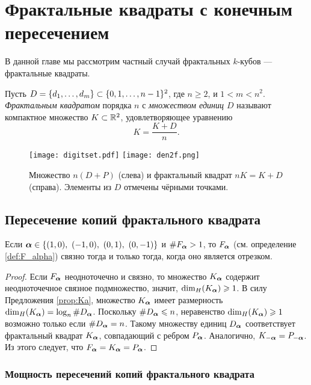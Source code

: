 \newpage
\chapter{Фрактальные квадраты с конечным пересечением}


В данной главе мы рассмотрим частный случай фрактальных $k$-кубов --- фрактальные квадраты.

\begin{definition}\label{dfn:FS} 
Пусть $D=\{d_1,\ldots,d_m\}\subset\{0,1,\ldots,n-1\}^2$, где $n\ge 2$, и $1<m<n^2$.
{\em Фрактальным квадратом} порядка $n$ с {\em множеством единиц $D$} называют компактное множество $K\subset\mathbb{R}^2$, удовлетворяющее уравнению
$$
K=\dfrac{K+D}{n}.
$$
\end{definition}

\begin{figure}[h]
 \centering
 \texttt{[image: digitset.pdf]}
 \hfill
 \texttt{[image: den2f.png]}
 \caption{Множество $n(D+P)$ (слева) и фрактальный квадрат $nK=K+D$ (справа). Элементы из $D$ отмечены чёрными точками.}
 \label{fig:fr_sq}
\end{figure}


\section{Пересечение копий фрактального квадрата}

\begin{corollary}
Если $\bma\in\{(1,0),\ (-1,0),\ (0,1),\ (0,-1)\}$ и $\#F_{\bm{\alpha}}>1$, то $F_{\bm{\alpha}}$ (см. определение \ref{def:F_alpha}) связно тогда и только тогда, когда оно является отрезком.
\end{corollary}

\begin{proof}
Если $F_{\bm{\alpha}}$ неодноточечно и связно, то множество $K_{{\bm{\alpha}}}$ содержит неодноточечное связное подмножество, значит, $\dim_H(K_{{\bm{\alpha}}})\geqslant1$.
В силу Предложения \ref{prop:Ka}, множество $K_{{\bm{\alpha}}}$ имеет размерность $\dim_H(K_{{\bm{\alpha}}})=\log_n\#D_{{\bm{\alpha}}}$.
Поскольку $\#D_{{\bm{\alpha}}}\leqslant n$, неравенство $\dim_H(K_{{\bm{\alpha}}})\geqslant1$ возможно только если $\#D_{{\bm{\alpha}}}= n$.
Такому множеству единиц $D_{{\bm{\alpha}}}$ соответствует фрактальный квадрат $K_{{\bm{\alpha}}}$, совпадающий с ребром $P_{{\bm{\alpha}}}$.
Аналогично, $K_{-{\bm{\alpha}}}=P_{-{\bm{\alpha}}}$.
Из этого следует, что $F_{\bm{\alpha}}=K_{{\bm{\alpha}}}=P_{{\bm{\alpha}}}$.
\end{proof}


\subsection{Мощность пересечений копий фрактального квадрата}

